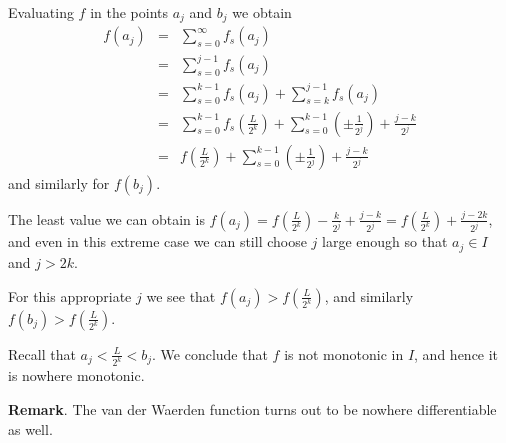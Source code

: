 \documentclass[12pt]{article}
\begin{document}
Evaluating $f$ in the points $a_j$ and $b_j$ we obtain
\begin{eqnarray*}
f(a_j) & = & \sum_{s =0}^{\infty}f_s(a_j) \\
& = & \sum_{s =0}^{j-1}f_s(a_j) \\
& = & \sum_{s =0}^{k-1}f_s(a_j) + \sum_{s =k}^{j-1}f_s(a_j) \\
& = & \sum_{s =0}^{k-1}f_s(\frac{L}{2^k}) + \sum_{s =0}^{k-1}(\pm \frac{1}{2^j}) + \frac{j-k}{2^j} \\
& = & f(\frac{L}{2^k}) + \sum_{s =0}^{k-1}(\pm \frac{1}{2^j}) + \frac{j-k}{2^j}
\end{eqnarray*}
and similarly for $f(b_j)$.

The least value we can obtain is $\displaystyle f(a_j) = f(\frac{L}{2^k}) -  \frac{k}{2^j} + \frac{j-k}{2^j}= f(\frac{L}{2^k})+ \frac{j-2k}{2^j}$, and even in this extreme case we can still choose $j$ large enough so that $a_j \in I$ and $j > 2k$.

For this appropriate $j$ we see that $f(a_j)> f(\frac{L}{2^k})$, and similarly $f(b_j) > f(\frac{L}{2^k})$.

Recall that $a_j < \frac{L}{2^k} < b_j$. We conclude that $f$ is not monotonic in $I$, and hence it is nowhere monotonic.

\textbf{Remark}.  The van der Waerden function turns out to be nowhere differentiable as well.
\end{document}
